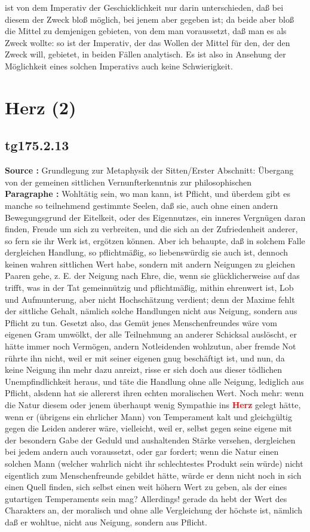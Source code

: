 \documentclass[a4paper,12pt,twoside]{book}
\newcommand{\match}[1]{\textcolor{red}{\textbf{#1}}}
\newcommand{\unnumberedsection}[1]{
	\section*{#1}
	\addcontentsline{toc}{section}{#1}
	\markright{#1}
}
\begin{document}
ist von dem Imperativ der Geschicklichkeit nur darin unterschieden, daß bei diesem der Zweck bloß möglich, bei jenem aber gegeben ist; da beide aber bloß die Mittel zu demjenigen gebieten, von dem man voraussetzt, daß man es als Zweck wollte: so ist der  Imperativ, der das Wollen der Mittel für den, der den Zweck will, gebietet, in beiden Fällen analytisch. Es ist also in Ansehung der Möglichkeit eines solchen Imperativs auch keine Schwierigkeit. 
	
	\unnumberedsection{Herz (2)} 
	\subsection*{tg175.2.13} 
	\textbf{Source : }Grundlegung zur Metaphysik der Sitten/Erster Abschnitt: Übergang von der gemeinen sittlichen Vernunfterkenntnis zur philosophischen\\  
	
	\noindent\textbf{Paragraphe : }
	Wohltätig sein, wo man kann, ist Pflicht, und überdem gibt es manche so teilnehmend gestimmte Seelen, daß sie, auch ohne einen andern Bewegungsgrund der Eitelkeit, oder des Eigennutzes, ein inneres Vergnügen daran finden, Freude um sich zu verbreiten, und die sich an der Zufriedenheit anderer, so fern sie ihr Werk ist, ergötzen können. Aber ich behaupte, daß in solchem Falle dergleichen Handlung, so pflichtmäßig, so liebenswürdig sie auch ist, dennoch keinen wahren sittlichen Wert habe, sondern mit andern Neigungen zu gleichen Paaren gehe, z. E. der Neigung nach Ehre, die, wenn sie glücklicherweise auf das trifft, was in der Tat gemeinnützig und pflichtmäßig, mithin ehrenwert ist, Lob und Aufmunterung, aber nicht Hochschätzung verdient; denn der Maxime fehlt der sittliche Gehalt, nämlich solche Handlungen nicht aus Neigung, sondern aus Pflicht zu tun. Gesetzt also, das Gemüt jenes Menschenfreundes wäre vom eigenen Gram umwölkt, der alle Teilnehmung an anderer Schicksal auslöscht, er hätte immer noch Vermögen, andern Notleidenden wohlzutun, aber fremde Not rührte ihn nicht, weil er mit seiner eigenen gnug beschäftigt ist, und nun, da keine Neigung ihn mehr dazu anreizt, risse er sich doch aus dieser tödlichen Unempfindlichkeit heraus, und täte die Handlung ohne alle Neigung, lediglich aus Pflicht, alsdenn hat sie allererst ihren echten moralischen Wert. Noch mehr: wenn die Natur diesem oder jenem überhaupt wenig Sympathie ins \match{Herz} gelegt hätte, wenn er (übrigens ein ehrlicher Mann) von Temperament kalt und gleichgültig gegen die Leiden anderer wäre, vielleicht, weil er, selbst gegen seine eigene mit der besondern Gabe der Geduld und aushaltenden Stärke versehen, dergleichen bei jedem andern auch voraussetzt, oder gar fordert; wenn die Natur einen solchen Mann (welcher wahrlich nicht ihr schlechtestes Produkt sein würde) nicht eigentlich zum Menschenfreunde gebildet hätte, würde er denn nicht noch in sich einen Quell finden, sich selbst einen weit höhern Wert zu geben, als der eines gutartigen Temperaments sein mag? Allerdings! gerade da hebt der Wert des Charakters an, der  moralisch und ohne alle Vergleichung der höchste ist, nämlich daß er wohltue, nicht aus Neigung, sondern aus Pflicht. 
	
\end{document}
